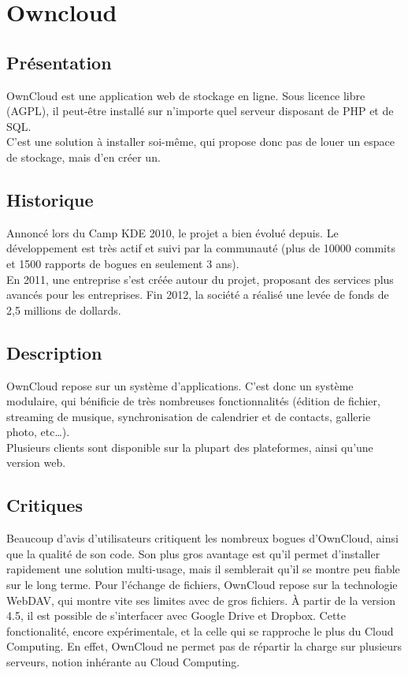 \chapter{Owncloud}
\thispagestyle{EIP} %
\section{Présentation}
OwnCloud est une application web de stockage en ligne. Sous licence libre (AGPL), il peut-être installé sur n'importe quel serveur disposant de PHP et de SQL.\\
C'est une solution à installer soi-même, qui propose donc pas de louer un espace de stockage, mais d'en créer un.\\

\section{Historique}
Annoncé lors du Camp KDE 2010, le projet a bien évolué depuis. Le développement est très actif et suivi par la communauté (plus de 10000 commits et 1500 rapports de bogues en seulement 3 ans).\\

En 2011, une entreprise s'est créée autour du projet, proposant des services plus avancés pour les entreprises. Fin 2012, la société a réalisé une levée de fonds de 2,5 millions de dollards.

\section{Description}
OwnCloud repose sur un système d'applications. C'est donc un système modulaire, qui bénificie de très nombreuses fonctionnalités (édition de fichier, streaming de musique, synchronisation de calendrier et de contacts, gallerie photo, etc…).\\
Plusieurs clients sont disponible sur la plupart des plateformes, ainsi qu'une version web.\\

\section{Critiques}
Beaucoup d'avis d'utilisateurs critiquent les nombreux bogues d'OwnCloud, ainsi que la qualité de son code. Son plus gros avantage est qu'il permet d'installer rapidement une solution multi-usage, mais il semblerait qu'il se montre peu fiable sur le long terme.
Pour l'échange de fichiers, OwnCloud repose sur la technologie WebDAV, qui montre vite ses limites avec de gros fichiers.
À partir de la version 4.5, il est possible de s'interfacer avec Google Drive et Dropbox. Cette fonctionalité, encore expérimentale, et la celle qui se rapproche le plus du Cloud Computing. En effet, OwnCloud ne permet pas de répartir la charge sur plusieurs serveurs, notion inhérante au Cloud Computing.
